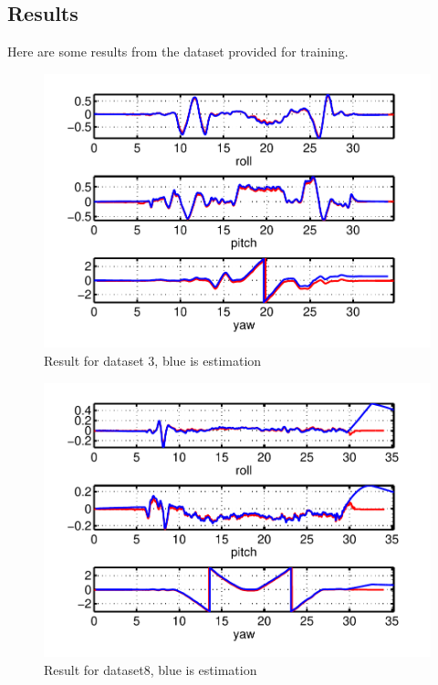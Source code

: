 \documentclass[twoside]{article}
\begin{document}
\begin{multicols}{2}
\section{Results}
Here are some results from the dataset provided for training.
\begin{figure}[H]
\centering
\includegraphics[width=\columnwidth]{fig/data3.pdf} 
\caption{Result for dataset 3, blue is estimation}
\label{fig:estimation}
\end{figure}

\begin{figure}[H]
\centering
\includegraphics[width=\columnwidth]{fig/data8.pdf} 
\caption{Result for dataset8, blue is estimation}
\label{fig:estimation}
\end{figure}


\end{multicols}
\end{document}
